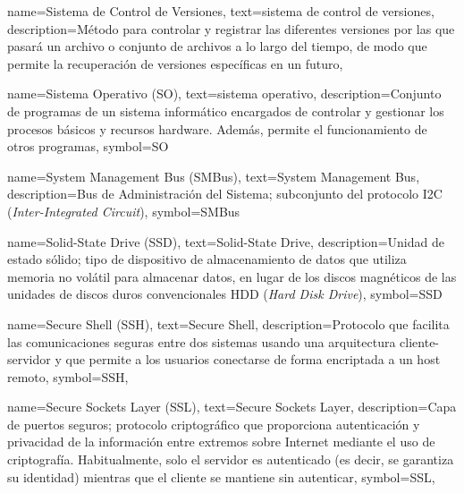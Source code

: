 {
    name={Sistema de Control de Versiones},
    text={sistema de control de versiones},
    description={Método para controlar y registrar las diferentes versiones por las que pasará un archivo o conjunto de archivos a lo largo del tiempo, de modo que permite la recuperación de versiones específicas en un futuro},
}

{
    name={Sistema Operativo (SO)},
    text={sistema operativo},
    description={Conjunto de programas de un sistema informático encargados de controlar y gestionar los procesos básicos y recursos hardware. Además, permite el funcionamiento de otros programas},
    symbol={SO}
}

{
    name={System Management Bus (SMBus)},
    text={System Management Bus},
    description={Bus de Administración del Sistema; subconjunto del protocolo I2C (\textit{Inter-Integrated Circuit})},
    symbol={SMBus}
}

{
    name={Solid-State Drive (SSD)},
    text={Solid-State Drive},
    description={Unidad de estado sólido; tipo de dispositivo de almacenamiento de datos que utiliza memoria no volátil para almacenar datos, en lugar de los discos magnéticos de las unidades de discos duros convencionales HDD (\textit{Hard Disk Drive})},
    symbol={SSD}
}

{
    name={Secure Shell (SSH)},
    text={Secure Shell},
    description={Protocolo que facilita las comunicaciones seguras entre dos sistemas usando una arquitectura cliente-servidor y que permite a los usuarios conectarse de forma encriptada a un host remoto},
    symbol={SSH},
}

{
    name={Secure Sockets Layer (SSL)},
    text={Secure Sockets Layer},
    description={Capa de puertos seguros; protocolo criptográfico que proporciona autenticación y privacidad de la información entre extremos sobre Internet mediante el uso de criptografía. Habitualmente, solo el servidor es autenticado (es decir, se garantiza su identidad) mientras que el cliente se mantiene sin autenticar},
    symbol={SSL},
}


